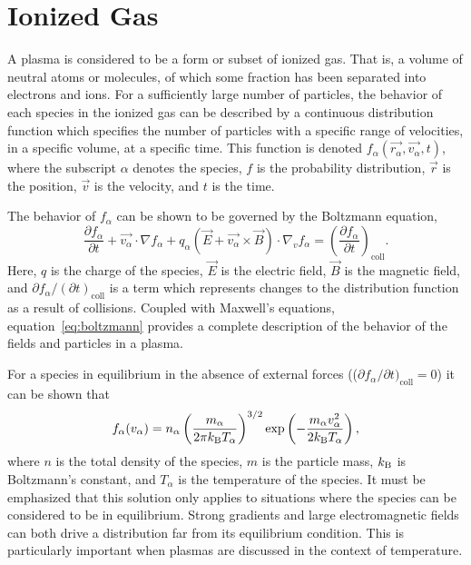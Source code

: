 \section{Ionized Gas}
A plasma is considered to be a form or subset of ionized gas. That is, a
volume of neutral atoms or molecules, of which some fraction has been
separated into electrons and ions. For a sufficiently large number of
particles, the behavior of each species in the ionized gas can be
described by a continuous distribution function which specifies the
number of particles with a specific range of velocities, in a specific
volume, at a specific time. This function is denoted
$f_\alpha(\vec{r_\alpha}, \vec{v_\alpha}, t)$, where the subscript
$\alpha$ denotes the species, $f$ is the probability distribution,
$\vec{r}$ is the position, $\vec{v}$ is the velocity, and $t$ is the
time.

The behavior of $f_\alpha$ can be shown to be governed by the Boltzmann
equation,
\begin{equation}\label{eq:boltzmann}
  \frac{\partial f_\alpha}{\partial t} + \vec{v_\alpha}\cdot\nabla f_\alpha +
  q_\alpha \left(\vec{E} + \vec{v_\alpha}\times\vec{B}\right)
  \cdot \nabla_v f_\alpha = \left( \frac{\partial f_\alpha}
  {\partial t}\right)_\mathrm{coll}.
\end{equation}
Here, $q$ is the charge of the species, $\vec{E}$ is the electric field,
$\vec{B}$ is the magnetic field, and $\partial f_\alpha/(\partial
t)_\mathrm{coll}$ is a term which represents changes to the distribution
function as a result of collisions. Coupled with Maxwell's equations,
equation~\ref{eq:boltzmann} provides a complete description of the
behavior of the fields and particles in a plasma.

For a species in equilibrium in the absence of external forces
(($\partial f_\alpha/\partial t)_\mathrm{coll} = 0$) it can be shown
that
\begin{equation}\label{eq:mb}
  f_\alpha(v_\alpha) =
    n_\alpha\left( \frac{m_\alpha}{2\pi k_\mathrm{B} T_\alpha}\right)^{3/2}
   \exp\left(-\frac{m_\alpha v_\alpha^2}{2k_\mathrm{B} T_\alpha}\right),
\end{equation}
where $n$ is the total density of the species, $m$ is the particle mass,
$k_\mathrm{B}$ is Boltzmann's constant, and $T_\alpha$ is the temperature of the
species. It must be emphasized that this solution only applies to
situations where the species can be considered to be in equilibrium.
Strong gradients and large electromagnetic fields can both drive a
distribution far from its equilibrium condition. This is particularly
important when plasmas are discussed in the context of temperature.

